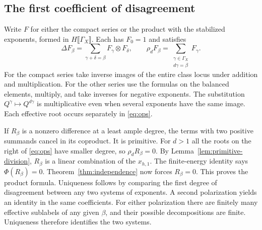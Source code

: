 \subsection{The first coefficient of disagreement}
Write $F$ for either the compact series or the product with the
stabilized exponents, formed in $H\llbracket\Gamma_X\rrbracket$.
Each has $F_0=1$ and satisfies
\begin{equation}\label{eq:ops}
 \Delta F_\beta=\sum_{\gamma+\delta=\beta}F_\gamma\otimes F_\delta,
 \qquad
 \rho_d F_\beta=\sum_{\substack{\gamma\in\Gamma_X\\d\gamma=\beta}}F_\gamma .
\end{equation}
For the compact series take inverse images of the entire class locus
under addition and multiplication. For the other series use the
formulas on the balanced elements, multiply, and take inverses for
negative exponents. The substitution $Q^\gamma\mapsto Q^{d\gamma}$
is multiplicative even when several exponents have the same image.
Each effective root occurs separately in \eqref{eq:ops}.

If $R_\beta$ is a nonzero difference at a least ample degree, the
terms with two positive summands cancel in its coproduct. It is
primitive. For $d>1$ all the roots on the right of \eqref{eq:ops}
have smaller degree, so $\rho_d R_\beta=0$. By
Lemma~\ref{lem:primitive-division}, $R_\beta$ is a linear combination
of the $x_{h,1}$.
The finite-energy identity says $\Phi(R_\beta)=0$.
Theorem~\ref{thm:independence} now forces $R_\beta=0$.
This proves the product formula. Uniqueness follows by comparing the
first degree of disagreement between any two systems of exponents.
A second polarization yields an identity in the same coefficients. For either polarization there are finitely many effective sublabels
of any given $\beta$, and their possible decompositions are finite.
Uniqueness therefore identifies the two systems.

